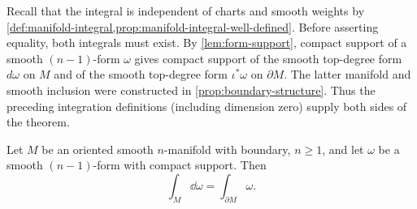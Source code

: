 Recall that the integral is independent of charts and smooth weights
by \cref{def:manifold-integral,prop:manifold-integral-well-defined}.
Before asserting equality, both integrals must exist. By
\cref{lem:form-support}, compact support of a smooth $(n-1)$-form
$\omega$ gives compact support of the smooth top-degree form $d\omega$
on $M$ and of the smooth top-degree form $\iota^*\omega$ on $\partial M$.
The latter manifold and smooth inclusion were constructed in
\cref{prop:boundary-structure}. Thus the preceding integration definitions
(including dimension zero) supply both sides of the theorem.

\begin{theorem}
\label{thm:general-stokes}
Let $M$ be an oriented smooth $n$-manifold with boundary, $n\geq1$, and let $\omega$ be
a smooth $(n-1)$-form with compact support.  Then
\[
\int_M\dd\omega=\int_{\partial M}\omega.
\]
\end{theorem}
